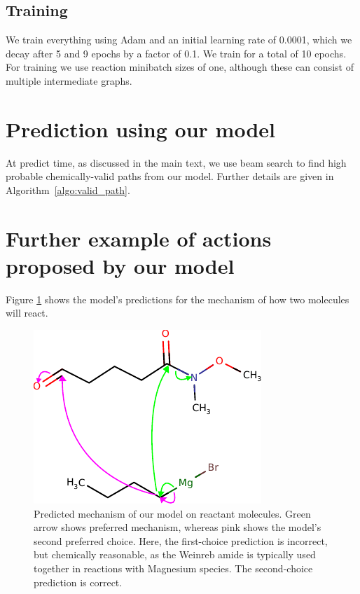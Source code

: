 \subsection{Training}

We train everything using Adam \citep{kingma2014adam} and an initial learning rate of 0.0001, which we decay after 5 and 9 epochs by a factor of 0.1. 
We train for a total of 10 epochs.
For training we use reaction minibatch sizes of one, although these can consist of multiple intermediate graphs.



\section{Prediction using our model}

At predict time, as discussed in the main text, we use beam search to find high probable chemically-valid paths from our model. Further details are given in Algorithm~\ref{algo:valid_path}.





\newpage
\quad
\newpage

\section{Further example of actions proposed by our model}

Figure \ref{fig:extra-textbook-example} shows the model's predictions for the mechanism of how two molecules will react. 

\begin{figure}[h]
        \centering
        \includegraphics{imgs/textbook/reactants2}
        \caption{Predicted mechanism of our model on reactant molecules. Green arrow shows preferred mechanism, whereas pink shows the model's second preferred choice. Here, the first-choice prediction is incorrect, but chemically reasonable, as the Weinreb amide is typically used together in reactions with Magnesium species. The second-choice prediction is correct.}
        \label{fig:extra-textbook-example}
\end{figure}

